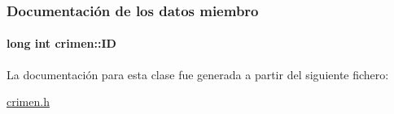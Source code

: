 \subsubsection{Documentación de los datos miembro}
\hypertarget{classcrimen_a59702f88f0b0c25781ae3d296790dcb8}{
\paragraph[{I\+D}]{\setlength{\rightskip}{0pt plus 5cm}long int crimen\+::\+I\+D\hspace{0.3cm}{\ttfamily [private]}}}\label{classcrimen_a59702f88f0b0c25781ae3d296790dcb8}


La documentación para esta clase fue generada a partir del siguiente fichero\+:\begin{DoxyCompactItemize}
\item 
\hyperlink{crimen_8h}{crimen.\+h}\end{DoxyCompactItemize}
